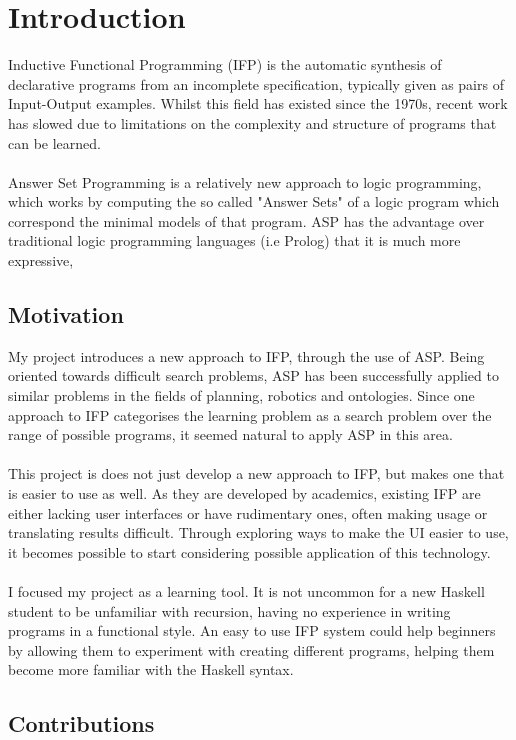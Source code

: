 \chapter{Introduction}

Inductive Functional Programming (IFP) is the automatic synthesis of declarative programs from an incomplete specification, typically given as pairs of Input-Output examples. Whilst this field has existed since the 1970s, recent work has slowed due to limitations on the complexity and structure of programs that can be learned. \\ \\
Answer Set Programming is a relatively new approach to logic programming, which works by computing the so called "Answer Sets" of a logic program which correspond the minimal models of that program. ASP has the advantage over traditional logic programming languages (i.e Prolog) that it is much more expressive, 

\section{Motivation}

My project introduces a new approach to IFP, through the use of ASP. Being oriented towards difficult search problems, ASP has been successfully applied to similar problems in the fields of planning, robotics and ontologies. Since one approach to IFP categorises the learning problem as a search problem over the range of possible programs, it seemed natural to apply ASP in this area. \\ \\
This project is does not just develop a new approach to IFP, but makes one that is easier to use as well. As they are developed by academics, existing IFP are either lacking user interfaces or have rudimentary ones, often making usage or translating results difficult. Through exploring ways to make the UI easier to use, it becomes possible to start considering possible application of this technology. \\ \\
I focused my project as a learning tool. It is not uncommon for a new Haskell student to be unfamiliar with recursion, having no experience in writing programs in a functional style. An easy to use IFP system could help beginners by allowing them to experiment with creating different programs, helping them become more familiar with the Haskell syntax.

\section{Contributions}

